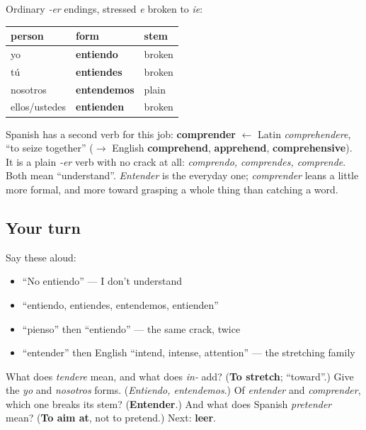 \begin{grammarlens}[title={Grammar Lens: an -er verb that cracks, and a calmer twin}]
Ordinary \emph{-er} endings, stressed \emph{e} broken to \emph{ie}:

\noindent
\begin{tabularx}{\linewidth}{@{}>{\raggedright\arraybackslash}X>{\raggedright\arraybackslash}X>{\raggedright\arraybackslash}X@{}}
\toprule
\textbf{person} & \textbf{form} & \textbf{stem} \\
\midrule
yo & \textbf{entiendo} & broken \\
tú & \textbf{entiendes} & broken \\
nosotros & \textbf{entendemos} & plain \\
ellos/ustedes & \textbf{entienden} & broken \\
\bottomrule
\end{tabularx}

Spanish has a second verb for this job: \textbf{comprender} $\leftarrow$ Latin \emph{comprehendere}, \textquotedblleft{}to seize together\textquotedblright{} ($\to$ English \textbf{comprehend}, \textbf{apprehend}, \textbf{comprehensive}). It is a plain \emph{-er} verb with no crack at all: \emph{comprendo, comprendes, comprende}. Both mean \textquotedblleft{}understand\textquotedblright{}. \emph{Entender} is the everyday one; \emph{comprender} leans a little more formal, and more toward grasping a whole thing than catching a word.
\end{grammarlens}

\subsection*{Your turn}
Say these aloud:

\begin{itemize}
\raggedright
  \item \textquotedblleft{}No entiendo\textquotedblright{} — I don't understand
  \item \textquotedblleft{}entiendo, entiendes, entendemos, entienden\textquotedblright{}
  \item \textquotedblleft{}pienso\textquotedblright{} then \textquotedblleft{}entiendo\textquotedblright{} — the same crack, twice
  \item \textquotedblleft{}entender\textquotedblright{} then English \textquotedblleft{}intend, intense, attention\textquotedblright{} — the stretching family
\end{itemize}

\begin{tcolorbox}[breakable,colback=teal!4,colframe=teal!35!black,title={Before you move on}]
What does \emph{tendere} mean, and what does \emph{in-} add? (\textbf{To stretch}; \textquotedblleft{}toward\textquotedblright{}.) Give the \emph{yo} and \emph{nosotros} forms. (\emph{Entiendo, entendemos}.) Of \emph{entender} and \emph{comprender}, which one breaks its stem? (\textbf{Entender}.) And what does Spanish \emph{pretender} mean? (\textbf{To aim at}, not to pretend.) Next: \textbf{leer}.
\end{tcolorbox}
